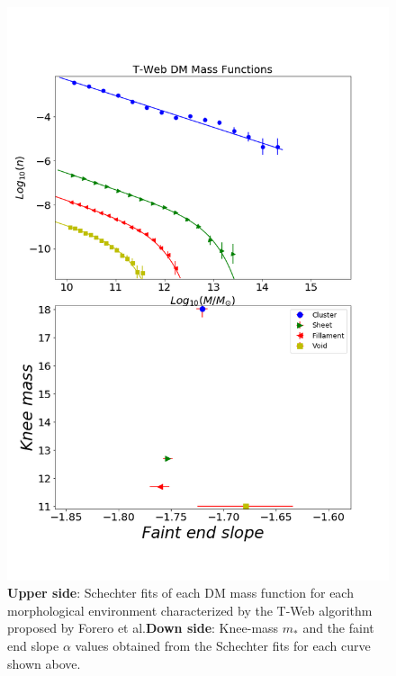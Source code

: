 \documentclass[a4paper,fleqn,usenatbib]{mnras}
\begin{document}
\begin{figure}
	\includegraphics[width=\columnwidth]{./pics/T-Web_DM.png}
    \caption{\textbf{Upper side}: Schechter fits of each DM mass
      function for each morphological environment characterized by the
      T-Web algorithm proposed by Forero et al.\textbf{Down side}:
      Knee-mass $m_\ast$ and the faint end slope $\alpha$ values
      obtained from the Schechter fits for each curve shown above.} 
    \label{fig:TwebDM}
\end{figure}
\end{document}
